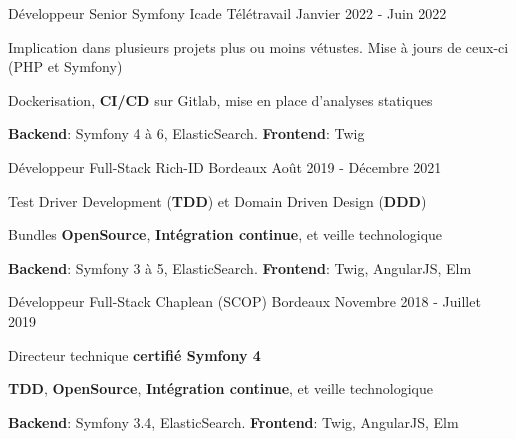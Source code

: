 

\begin{cventries}
  \cventry
    {Développeur Senior Symfony} %
    {Icade} %
    {Télétravail} %
    {Janvier 2022 - Juin 2022} %
    {
      \begin{cvitems} %
        \item {Implication dans plusieurs projets plus ou moins vétustes. Mise à jours de ceux-ci (PHP et Symfony)}
        \item {Dockerisation, \textbf{CI/CD} sur Gitlab, mise en place d'analyses statiques}
        \item {\textbf{Backend}: Symfony 4 à 6, ElasticSearch. \textbf{Frontend}: Twig}
      \end{cvitems}
    }

  \cventry
    {Développeur Full-Stack} %
    {Rich-ID} %
    {Bordeaux} %
    {Août 2019 - Décembre 2021} %
    {
      \begin{cvitems} %
        \item {Test Driver Development (\textbf{TDD}) et Domain Driven Design (\textbf{DDD})}
         \item {Bundles \textbf{OpenSource}, \textbf{Intégration continue}, et veille technologique}
        \item {\textbf{Backend}: Symfony 3 à 5, ElasticSearch. \textbf{Frontend}: Twig, AngularJS, Elm}
      \end{cvitems}
    }

  \cventry
    {Développeur Full-Stack} %
    {Chaplean (SCOP)} %
    {Bordeaux} %
    {Novembre 2018 - Juillet 2019} %
    {
      \begin{cvitems} %
        \item {Directeur technique \textbf{certifié Symfony 4}}
        \item {\textbf{TDD}, \textbf{OpenSource}, \textbf{Intégration continue}, et veille technologique}
        \item {\textbf{Backend}: Symfony 3.4, ElasticSearch. \textbf{Frontend}: Twig, AngularJS, Elm}
      \end{cvitems}
    }

\end{cventries}
